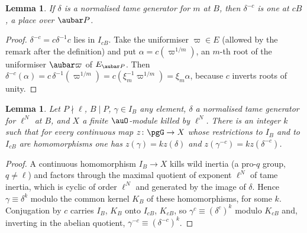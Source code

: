 \documentclass[10pt]{amsart}
\newtheorem{lemma}[theorem]{Lemma}
\theoremstyle{definition}
\theoremstyle{remark}
\begin{document}
\begin{lemma}\label{pse:conjgen}
If $\delta$ is a normalised tame generator for $m$ at $B$, then $\delta^{-c}$ is one at $cB$, a
place over $\aubar P$.
\end{lemma}
\begin{proof}
$\delta^{-c}=c\delta^{-1}c$ lies in $I_{cB}$. Take the uniformiser $\varpi\in E$ (allowed by the remark after the
definition) and put $\alpha=c(\varpi^{1/m})$, an $m$-th root of the
uniformiser $\aubar\varpi$ of $E_{\aubar P}$. Then $\delta^{-c}(\alpha)=c\,\delta^{-1}(\varpi^{1/m})
=c(\xi_m^{-1}\varpi^{1/m})=\xi_m\alpha$, because $c$ inverts roots of unity.
\end{proof}

\begin{lemma}\label{pse:kpower}
Let $P\nmid\ell$, $B\mid P$, $\gamma\in I_B$ any element, $\delta$ a normalised tame generator for
$\ell^N$ at $B$, and $X$ a finite $\auO$-module killed by $\ell^N$. There is an integer $k$ such that
for every continuous map $z\colon\pgG\to X$ whose restrictions to $I_B$ and to $I_{cB}$ are
homomorphisms one has $z(\gamma)=kz(\delta)$ and $z(\gamma^{-c})=kz(\delta^{-c})$.
\end{lemma}
\begin{proof}
A continuous homomorphism $I_B\to X$ kills wild inertia (a pro-$q$ group, $q\ne\ell$) and factors
through the maximal quotient of exponent $\ell^N$ of tame inertia, which is cyclic of order
$\ell^N$ and generated by the image of $\delta$. Hence $\gamma\equiv\delta^k$ modulo the common
kernel $K_B$ of these homomorphisms, for some $k$. Conjugation by $c$ carries $I_B$, $K_B$ onto
$I_{cB}$, $K_{cB}$, so $\gamma^{c}\equiv(\delta^{c})^k$ modulo $K_{cB}$ and, inverting in the abelian
quotient, $\gamma^{-c}\equiv(\delta^{-c})^k$.
\end{proof}
\end{document}
